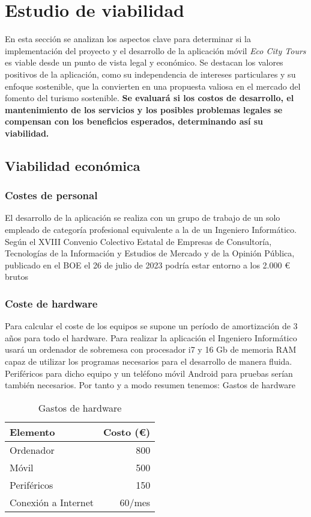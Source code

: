 \section{Estudio de viabilidad}
En esta sección se analizan los aspectos clave para determinar si la implementación del proyecto y el desarrollo de la aplicación móvil \textit{Eco City Tours} es viable desde un punto de vista legal y económico. Se destacan los valores positivos de la aplicación, como su independencia de intereses particulares y su enfoque sostenible, que la convierten en una propuesta valiosa en el mercado del fomento del turismo sostenible. \textbf{Se evaluará si los costos de desarrollo, el mantenimiento de los servicios y los posibles problemas legales se compensan con los beneficios esperados, determinando así su viabilidad.}
\subsection{Viabilidad económica}
\subsubsection{Costes de personal}
El desarrollo de la aplicación se realiza con un grupo de trabajo de un solo empleado de categoría profesional equivalente a la de un Ingeniero Informático. Según el XVIII Convenio Colectivo Estatal de Empresas de Consultoría, Tecnologías de la Información y Estudios de Mercado y de la Opinión Pública, publicado en el BOE el 26 de julio de 2023 \cite{boe2023_consultoria} podría estar entorno a los 2.000 € brutos
\subsubsection{Coste de hardware}
Para calcular el coste de los equipos se supone un período de amortización de 3 años para todo el hardware. Para realizar la aplicación el Ingeniero Informático usará un ordenador de sobremesa con procesador i7 y 16 Gb de memoria RAM capaz de utilizar los programas necesarios para el desarrollo de manera fluida. Periféricos para dicho equipo y un teléfono móvil Android para pruebas serían también necesarios. Por tanto y a modo resumen tenemos:
\tablaSmallSinColores
{Gastos de hardware}

\begin{table}[H]
	\centering
	\begin{tabular}{l r}
		\toprule
		Elemento & Costo (€) \\
		\midrule
		Ordenador & 800 \\
		Móvil & 500 \\
		Periféricos & 150 \\
		Conexión a Internet & 60/mes \\
		\bottomrule
	\end{tabular}
	\caption{Gastos de hardware}
	\label{tabla:gastos_hardware}
\end{table}





